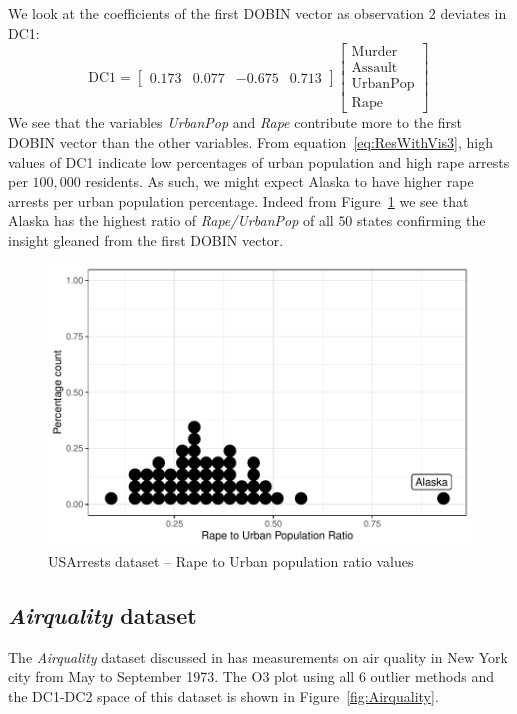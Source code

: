 \documentclass[11pt]{article}
\begin{document}
We look at the coefficients of the first DOBIN vector as observation $2$ deviates in DC1:
\begin{equation}\label{eq:ResWithVis3}
    \text{DC1} = \begin{bmatrix}
    0.173 & 0.077 &  -0.675 & 0.713   
    \end{bmatrix}
    \begin{bmatrix}
    \text{Murder} \\
    \text{Assault} \\
    \text{UrbanPop} \\
    \text{Rape} 
    \end{bmatrix} \, 
\end{equation}
We see that the variables \textit{UrbanPop} and \textit{Rape} contribute more to the first DOBIN vector than the other variables. From equation~\eqref{eq:ResWithVis3},  high values of DC1 indicate  low percentages of urban population and high rape arrests per $100,000$ residents. As such, we might expect Alaska to have higher rape arrests per urban population percentage. Indeed from Figure~\ref{fig:USArrests3} we see that Alaska has the highest ratio of  \textit{Rape/UrbanPop} of all $50$ states confirming the insight gleaned from the first DOBIN vector. 

\begin{figure}
	\centering
	\includegraphics[scale=0.48]{Ex3_3.pdf}
	\caption{USArrests dataset -- Rape to Urban population ratio values}
	\label{fig:USArrests3}
\end{figure}


\subsection{\textit{Airquality} dataset}\label{sec:ResWithVis4}
The \textit{Airquality} dataset discussed in \cite{john1983graphical} has measurements on air quality in New York city from May to September 1973.  The O3 plot using all $6$ outlier methods and the DC1-DC2 space of this dataset is shown in Figure~\ref{fig:Airquality}.
\end{document}
